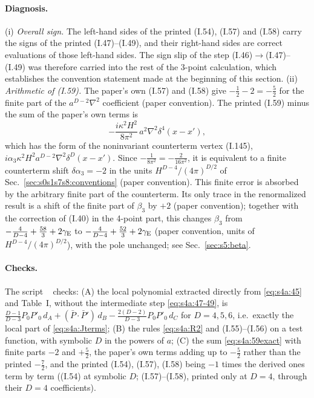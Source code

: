 \documentclass[aps,prd,onecolumn,10pt,nofootinbib,floatfix]{revtex4-2}
\newcommand{\eqI}[1]{(I.#1)}
\begin{document}
\paragraph*{Diagnosis.}
(i) \emph{Overall sign.} The left-hand sides of the printed \eqI{54}, \eqI{57} and \eqI{58} carry the
signs of the printed \eqI{47}--\eqI{49}, and their right-hand sides are correct evaluations of those
left-hand sides. The sign slip of the step \eqI{46}$\to$\eqI{47}--\eqI{49} was therefore carried into
the rest of the 3-point calculation, which establishes the convention statement made at the beginning
of this section.
(ii) \emph{Arithmetic of \eqI{59}.} The paper's own \eqI{57} and \eqI{58} give
$-\frac12-2=-\frac52$ for the finite part of the $a^{D-2}\nabla^2$ coefficient (paper convention).
The printed \eqI{59} minus the sum of the paper's own terms is
\begin{equation}
-\frac{i\kappa^2H^2}{8\pi^2}\,a^2\nabla^2\delta^4(x-x'),
\label{eq:s4a:59diff}
\end{equation}
which has the form of the noninvariant counterterm vertex \eqI{145},
$i\alpha_3\kappa^2H^2a^{D-2}\nabla^2\delta^D(x-x')$. Since $-\frac1{8\pi^2}=-\frac{2}{16\pi^2}$, it is equivalent to a finite
counterterm shift $\delta\alpha_3=-2$ in the units $H^{D-4}/(4\pi)^{D/2}$ of Sec.~\ref{sec:s0s1s7s8:conventions} (paper convention).
This finite error is absorbed by the arbitrary finite part of the counterterm. Its only trace in the renormalized
result is a shift of the finite part of $\beta_3$ by $+2$ (paper convention); together with the
correction of \eqI{40} in the 4-point part, this changes $\beta_3$ from
$-\frac{4}{D-4}+\frac{58}{3}+2\gamma_{\rm E}$ to $-\frac{4}{D-4}+\frac{52}{3}+2\gamma_{\rm E}$ (paper convention, units of
$H^{D-4}/(4\pi)^{D/2}$), with the pole unchanged; see Sec.~\ref{sec:s5:beta}.

\paragraph*{Checks.}
The script ~\cite{ref:repo} checks:
(A) the local polynomial extracted directly from \eqref{eq:s4a:45} and Table~I, without the
intermediate step \eqref{eq:s4a:47-49}, is
$\frac{D-1}{D-3}P_0P'_0\,d_A+(\bar P\!\cdot\!\bar P')\,d_B-\frac{2(D-2)}{D-3}P_0P'_0\,d_C$ for $D=4,5,6$,
i.e.\ exactly the local part of \eqref{eq:s4a:Jterms};
(B) the rules \eqref{eq:s4a:R2} and \eqI{55}--\eqI{56} on a test function, with symbolic $D$ in the
powers of $a$;
(C) the sum \eqref{eq:s4a:59exact} with finite parts $-2$ and $+\frac52$, the paper's own terms adding up
to $-\frac52$ rather than the printed $-\frac72$, and the printed \eqI{54}, \eqI{57}, \eqI{58} being
$-1$ times the derived ones term by term (\eqI{54} at symbolic $D$; \eqI{57}--\eqI{58}, printed only at
$D=4$, through their $D=4$ coefficients).
\end{document}
